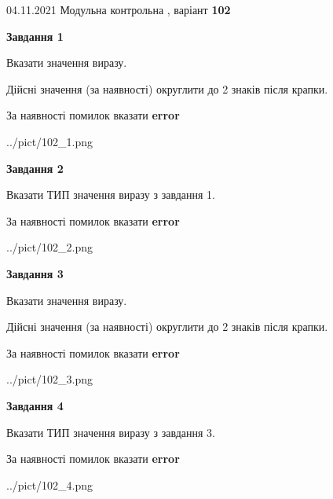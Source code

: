 \documentclass[11pt, ukrainian]{article}
\begin{document}
{04.11.2021 Модульна контрольна , варіант  \No \textbf { 102 }\par}
{
\begin {large}
{\begin {center}\textbf{Завдання 1}\end {center}}\par
Вказати значення виразу. \par
Дійсні значення (за наявності) округлити до 2 знаків після крапки. \par
За наявності помилок вказати \textbf{error}

\begin{center}
	{../pict/102_1.png}
\end{center}
\newpage

{\begin {center}\textbf{Завдання 2}\end {center}}\par
Вказати ТИП значення виразу з завдання 1. \par
За наявності помилок вказати \textbf{error}

\begin{center}
	{../pict/102_2.png}
\end{center}
\newpage

{\begin {center}\textbf{Завдання 3}\end {center}}\par
Вказати значення виразу. \par
Дійсні значення (за наявності) округлити до 2 знаків після крапки. \par
За наявності помилок вказати \textbf{error}

\begin{center}
	{../pict/102_3.png}
\end{center}
\newpage

{\begin {center}\textbf{Завдання 4}\end {center}}\par
Вказати ТИП значення виразу з завдання 3. \par
За наявності помилок вказати \textbf{error}

\begin{center}
	{../pict/102_4.png}
\end{center}
\newpage


\end{large}}
\end{document}
